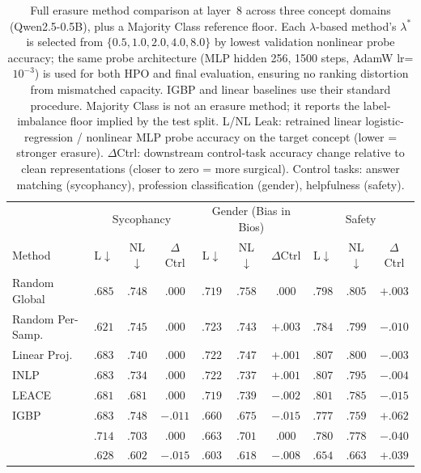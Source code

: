 \begin{table}[t]
\centering
\caption{Full erasure method comparison at layer~8 across three concept domains (Qwen2.5-0.5B), plus a Majority Class reference floor. Each $\lambda$-based method's $\lambda^*$ is selected from $\{0.5, 1.0, 2.0, 4.0, 8.0\}$ by lowest validation nonlinear probe accuracy; the same probe architecture (MLP hidden 256, 1500 steps, AdamW lr=$10^{-3}$) is used for both HPO and final evaluation, ensuring no ranking distortion from mismatched capacity. IGBP and linear baselines use their standard procedure. Majority Class is not an erasure method; it reports the label-imbalance floor implied by the test split. L/NL Leak: retrained linear logistic-regression / nonlinear MLP probe accuracy on the target concept (lower = stronger erasure). $\Delta$Ctrl: downstream control-task accuracy change relative to clean representations (closer to zero = more surgical). Control tasks: answer matching (sycophancy), profession classification (gender), helpfulness (safety).}
\label{tab:full_comparison}
\small
\setlength{\tabcolsep}{4pt}
\begin{tabular}{l|ccc|ccc|ccc}
\toprule
 & \multicolumn{3}{c|}{Sycophancy} & \multicolumn{3}{c|}{Gender (Bias in Bios)} & \multicolumn{3}{c}{Safety} \\
Method & L$\downarrow$ & NL$\downarrow$ & $\Delta$Ctrl & L$\downarrow$ & NL$\downarrow$ & $\Delta$Ctrl & L$\downarrow$ & NL$\downarrow$ & $\Delta$Ctrl \\
\midrule
Random Global    & $.685$ & $.748$ & $.000$ & $.719$ & $.758$ & $.000$  & $.798$ & $.805$ & $+.003$ \\
Random Per-Samp. & $.621$ & $.745$ & $.000$ & $.723$ & $.743$ & $+.003$ & $.784$ & $.799$ & $-.010$ \\
Linear Proj.     & $.683$ & $.740$ & $\boldsymbol{.000}$ & $.722$ & $.747$ & $+.001$ & $.807$ & $.800$ & $\boldsymbol{-.003}$ \\
INLP             & $.683$ & $.734$ & $\boldsymbol{.000}$ & $.722$ & $.737$ & $+.001$ & $.807$ & $.795$ & $-.004$ \\
LEACE            & $.681$ & $.681$ & $\boldsymbol{.000}$ & $.719$ & $.739$ & $-.002$ & $.801$ & $.785$ & $-.015$ \\
IGBP             & $.683$ & $.748$ & $-.011$ & $.660$ & $.675$ & $-.015$ & $.777$ & $.759$ & $+.062$ \\
\AmbGCE{}      & $.714$ & $.703$ & $\boldsymbol{.000}$ & $.663$ & $.701$ & $\boldsymbol{.000}$  & $.780$ & $.778$ & $-.040$ \\
\textbf{\TanGCE{}} & $\boldsymbol{.628}$ & $\boldsymbol{.602}$ & $-.015$ & $\boldsymbol{.603}$ & $\boldsymbol{.618}$ & $-.008$ & $\boldsymbol{.654}$ & $\boldsymbol{.663}$ & $+.039$ \\
\bottomrule
\end{tabular}
\end{table}
